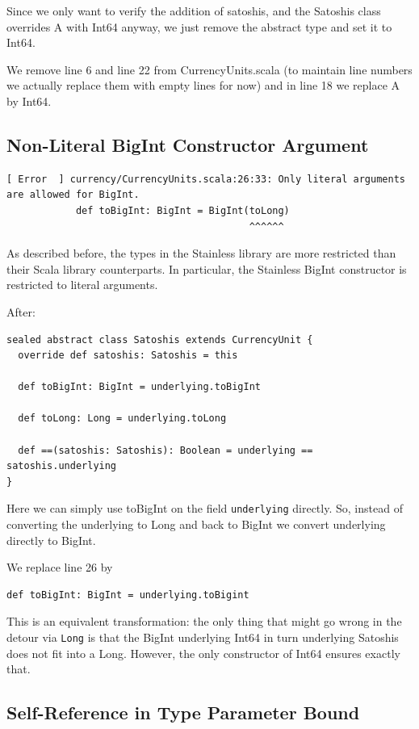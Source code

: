 \documentclass[runningheads]{llncs}
\begin{document}
Since we only want to verify the addition of satoshis, and the
Satoshis class overrides A with Int64 anyway, we just remove the
abstract type and set it to Int64.

We remove line 6 and line 22 from CurrencyUnits.scala (to maintain
line numbers we actually replace them with empty lines for now) and in
line 18 we replace A by Int64.


\subsection{Non-Literal BigInt Constructor Argument}


\begin{lstlisting}[style=stainless]
[ Error  ] currency/CurrencyUnits.scala:26:33: Only literal arguments are allowed for BigInt.
            def toBigInt: BigInt = BigInt(toLong)
                                          ^^^^^^
\end{lstlisting}

As described before, the types in the Stainless library are more
restricted than their Scala library counterparts. In particular, the
Stainless BigInt constructor is restricted to literal arguments.


After:
\begin{lstlisting}[style=scala]
sealed abstract class Satoshis extends CurrencyUnit {
  override def satoshis: Satoshis = this

  def toBigInt: BigInt = underlying.toBigInt

  def toLong: Long = underlying.toLong

  def ==(satoshis: Satoshis): Boolean = underlying == satoshis.underlying
}
\end{lstlisting}


Here we can simply use toBigInt on the field \texttt{underlying}
directly.  So, instead of converting the underlying to Long and back
to BigInt we convert underlying directly to BigInt.

We replace line 26 by
\begin{lstlisting}[style=scala]
def toBigInt: BigInt = underlying.toBigint
\end{lstlisting}

This is an equivalent transformation: the only thing that might go
wrong in the detour via \texttt{Long} is that the BigInt underlying
Int64 in turn underlying Satoshis does not fit into a Long. However,
the only constructor of Int64 ensures exactly that.

\subsection{Self-Reference in Type Parameter Bound}
\end{document}
